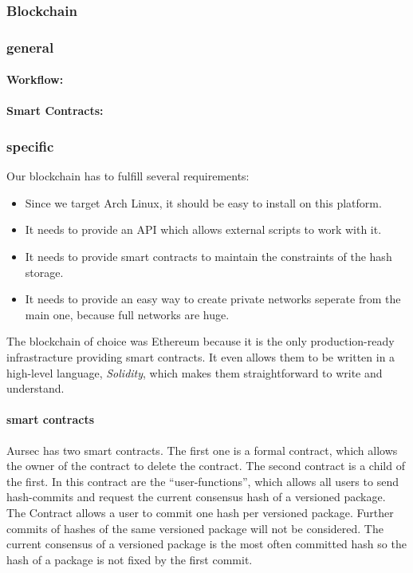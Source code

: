 \subsubsection{Blockchain} \label{sec:blockchain}
\subsubsection*{general}

\paragraph*{Workflow:}
\paragraph*{Smart Contracts:}

\subsubsection*{specific}
Our blockchain has to fulfill several requirements: %
\begin{itemize}
	\item Since we target Arch Linux, it should be easy to install on this platform.
	\item It needs to provide an API which allows external scripts to work with it.
	\item It needs to provide smart contracts to maintain the constraints of the hash storage.
	\item It needs to provide an easy way to create private networks seperate from the main one, because full networks are huge.
\end{itemize}

The blockchain of choice was Ethereum because it is the only production-ready infrastracture providing smart contracts. It even allows them to be written in a high-level language, \emph{Solidity}, which makes them straightforward to write and understand.

\paragraph*{smart contracts} %
Aursec has two smart contracts. The first one is a formal contract, which allows the owner of the contract to delete the contract. The second contract is a child of the first. In this contract are the ``user-functions'', which allows all users to send hash-commits and request the current consensus hash of a versioned package. The Contract allows a user to commit one hash per versioned package. Further commits of hashes of the same versioned package will not be considered. The current consensus of a versioned package is the most often committed hash so the hash of a package is not fixed by the first commit.  

